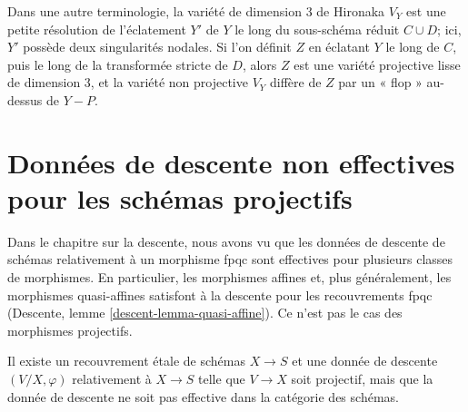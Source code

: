 \noindent
Dans une autre terminologie, la variété de dimension 3 de Hironaka $V_Y$ est une petite
résolution de l'éclatement $Y'$ de $Y$ le long du sous-schéma réduit
$C\cup D$; ici, $Y'$ possède deux singularités nodales. Si l'on définit $Z$ en éclatant
$Y$ le long de $C$, puis le long de la transformée stricte
de $D$, alors $Z$ est une variété projective lisse de dimension 3, et la variété non projective
$V_Y$ diffère de $Z$ par un « flop » au-dessus de $Y-P$.


\section[Descente non effective pour des schémas projectifs]{Données de descente non effectives pour les schémas projectifs}
\label{section-non-effective-descent-projective}

\noindent
Dans le chapitre sur la descente, nous avons vu que les données de descente de schémas relativement
à un morphisme fpqc sont effectives pour plusieurs classes
de morphismes. En particulier, les morphismes affines et, plus généralement,
les morphismes quasi-affines satisfont à la descente pour les recouvrements fpqc
(Descente, lemme \ref{descent-lemma-quasi-affine}).
Ce n'est pas le cas des morphismes projectifs.

\begin{lemma}
\label{lemma-non-effective-descent-projective}
Il existe un recouvrement étale de schémas $X\to S$ et une donnée de descente
$(V/X,\varphi)$ relativement à $X\to S$ telle que
$V\to X$ soit projectif,
mais que la donnée de descente ne soit pas effective dans la catégorie des schémas.
\end{lemma}

